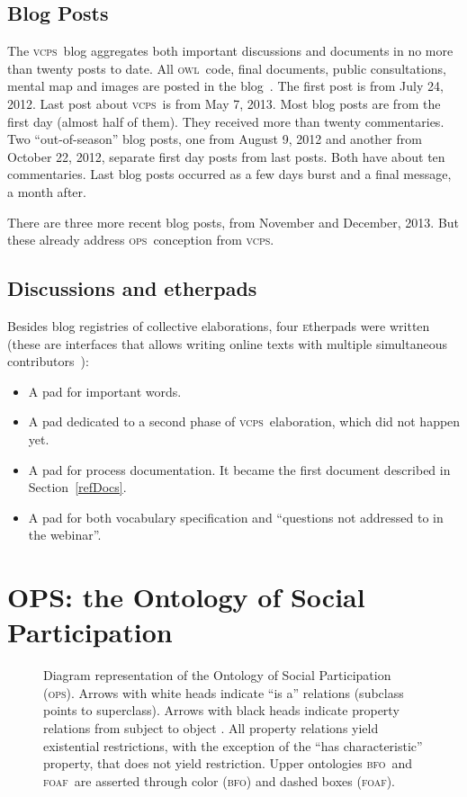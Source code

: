 \documentclass[10pt,letterpaper]{article}
\newcommand{\ops}{\textsc{ops}}
\newcommand{\vcps}{\textsc{vcps}}
\newcommand{\owl}{\textsc{owl}}
\newcommand{\bfo}{\textsc{bfo}}
\newcommand{\foaf}{\textsc{foaf}}
\newcommand{\etherpad}{\textsc{e}therpad}
\begin{document}
\subsection{Blog Posts}
The \vcps\ blog
aggregates both important discussions and documents in no more than twenty posts to date.
All \owl\ code, final documents, public consultations, mental map and images are posted in the blog~\cite{coraisBlog}. 
The first post is from July 24, 2012. Last post about \vcps\ is from May 7, 2013. Most blog posts are from the first day (almost half of them). They received more than
twenty commentaries. Two ``out-of-season'' blog posts, one from August 9, 2012 and another from October  22, 2012, separate first day posts from last posts. Both have about ten commentaries.
Last blog posts occurred as a few days burst and a final message, a month after.

There are three more recent blog posts, from November and December, 2013. But these already address \ops\ conception from \vcps.

\subsection{Discussions and etherpads}
Besides blog registries of collective elaborations, four \etherpad s
were written~\cite{etherpads} (these are interfaces that allows writing online texts with multiple simultaneous contributors~\cite{etherpads2}):
\begin{itemize}
    \item A pad for important words.
    \item A pad dedicated to a second phase of \vcps\ elaboration, which did not happen yet.
    \item A pad for process documentation. It became the first document described in Section~\ref{refDocs}. 
    \item A pad for both vocabulary specification and ``questions not addressed to in the webinar''.
\end{itemize}

\section{OPS: the Ontology of Social Participation}\label{exp}

\begin{figure}
    \centering
    \caption{Diagram representation of the Ontology of Social Participation (\ops). Arrows with white heads indicate ``is a'' relations (subclass points to superclass). Arrows with black heads indicate property relations from subject to object . All property relations yield existential restrictions, with the exception of the ``has characteristic'' property, that does not yield restriction. Upper ontologies \bfo\ and \foaf\ are asserted through color (\bfo) and dashed boxes (\foaf).}
    \label{fig:v1}
\end{figure}
\end{document}

